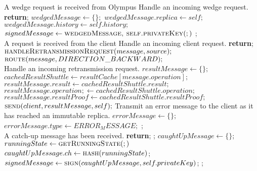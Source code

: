 \begin{algorithmic}[1]
\Require A wedge request is received from Olympus \Comment Handle an incoming wedge request.
    	\State \textbf{return};
    \EndIf
	\State $wedgedMessage\gets \{\};$
    \State $wedgedMessage.replica\gets self;$
    \State $wedgedMessage.history\gets self.history;$
    \State $signedMessage\gets \Call{wedgedMessage, self.privateKey};$
    \State {};
\EndFunction
\\

\Require A request is received from the client
 \Comment Handle an incoming client request.
    	\State \textbf{return};
    \EndIf
    	\State $\Call{handleRetransmissionRequest}{message, source};$
    \Else
        \State $\Call{route}{message, DIRECTION\_BACKWARD};$
    \EndIf
\EndFunction
\\

 \Comment Handle an incoming retransmission request.
        \State $resultMessage\gets \{\};$
        \State $cachedResultShuttle\gets resultCache[message.operation];$
        \State $resultMessage.result\gets cachedResultShuttle.result;$
        \State $resultMessage.operation;\gets cachedResultShuttle.operation;$
        \State $resultMessage.resultProof\gets cachedResultShuttle.resultProof;$
        \State $\Call{send}{client, resultMessage, self};$
    \Else
        \State \Comment Transmit an error message to the client as it has reached an immutable replica.
        \State $errorMessage\gets \{\};$
        \State $errorMessage.type\gets ERROR_MESSAGE;$
        \State {};
    \EndIf
\EndFunction
\\

\Require A catch-up message has been received.
    	\State \textbf{return};
    \EndIf
    	\State {};
    \EndFor
    \State $caughtUpMessage\gets \{\}$;
    \State $runningState \gets \Call{getRunningState};$
    \State $caughtUpMessage.ch\gets \Call{hash}{runningState}$;
    \State $signedMessage\gets \Call{sign}{caughtUpMessage, self.privateKey}$;
    \State {};
\EndFunction
\\


\end{algorithmic}

